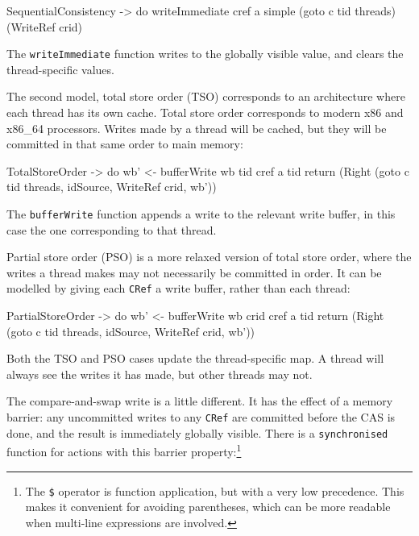 \begin{haskellcode}
  SequentialConsistency -> do
    writeImmediate cref a
    simple (goto c tid threads) (WriteRef crid)
\end{haskellcode}

The \verb|writeImmediate| function writes to the globally visible
value, and clears the thread-specific values.

The second model, total store order (TSO) corresponds to an
architecture where each thread has its own cache. Total store order
corresponds to modern x86 and x86\_64 processors. Writes made by a
thread will be cached, but they will be committed in that same order
to main memory:

\begin{haskellcode}
  TotalStoreOrder -> do
    wb' <- bufferWrite wb tid cref a tid
    return (Right (goto c tid threads, idSource, WriteRef crid, wb'))
\end{haskellcode}

The \verb|bufferWrite| function appends a write to the relevant write
buffer, in this case the one corresponding to that thread.

Partial store order (PSO) is a more relaxed version of total store order,
where the writes a thread makes may not necessarily be committed in
order. It can be modelled by giving each \verb|CRef| a write buffer,
rather than each thread:

\begin{haskellcode}
  PartialStoreOrder -> do
    wb' <- bufferWrite wb crid cref a tid
    return (Right (goto c tid threads, idSource, WriteRef crid, wb'))
\end{haskellcode}

Both the TSO and PSO cases update the thread-specific map. A thread
will always see the writes it has made, but other threads may not.

The compare-and-swap write is a little different. It has the effect of
a memory barrier: any uncommitted writes to any \verb|CRef| are
committed before the CAS is done, and the result is immediately
globally visible. There is a \verb|synchronised| function for actions
with this barrier property:\footnote{The \texttt{\$} operator is
  function application, but with a very low precedence. This makes it
  convenient for avoiding parentheses, which can be more readable when
  multi-line expressions are involved.}


